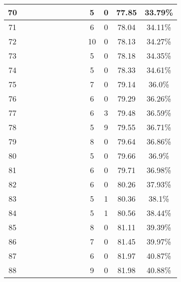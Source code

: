 \begin{longtable}{|c|c|c|c|c|c|c|c|c|c|c|c|c|}
70 &  \x    & \x    & \x    & \x    & \x    & \x\m  & \x    &       & 5 & 0 & 77.85 & 33.79\% \\ \hline
71 &  \x    & \x    & \x    & \x    &       & \x    &       &       & 6 & 0 & 78.04 & 34.11\% \\ \hline
72 &  \x    & \x    &       &       & \x\m  &       & \x\m  &       & 10 & 0 & 78.13 & 34.27\% \\ \hline
73 &  \x    & \x    & \x    &       & \x    & \x\m  &       & \x    & 5 & 0 & 78.18 & 34.35\% \\ \hline
74 &  \x    & \x    & \x    & \x    &       & \x\m  & \x\m  &       & 5 & 0 & 78.33 & 34.61\% \\ \hline
75 &  \x    & \x    & \x    & \x    &       &       &       & \x\m  & 7 & 0 & 79.14 & 36.0\% \\ \hline
76 &  \x    & \x    & \x    &       &       &       &       &       & 6 & 0 & 79.29 & 36.26\% \\ \hline
77 &  \x    & \x    & \x    &       &       & \x\m  &       & \x\m  & 6 & 3 & 79.48 & 36.59\% \\ \hline
78 &  \x    & \x    & \x    & \x    &       & \x\m  &       & \x\m  & 5 & 9 & 79.55 & 36.71\% \\ \hline
79 &  \x    & \x    & \x    &       &       &       &       & \x\m  & 8 & 0 & 79.64 & 36.86\% \\ \hline
80 &  \x    & \x    &       &       & \x    & \x    &       &       & 5 & 0 & 79.66 & 36.9\% \\ \hline
81 &  \x    & \x    & \x    &       & \x    & \x    & \x\m  &       & 6 & 0 & 79.71 & 36.98\% \\ \hline
82 &  \x    & \x    & \x    & \x    &       &       & \x    &       & 6 & 0 & 80.26 & 37.93\% \\ \hline
83 &  \x    & \x    & \x    &       &       &       & \x    &       & 5 & 1 & 80.36 & 38.1\% \\ \hline
84 &  \x    & \x    & \x    &       & \x\m  &       &       & \x    & 5 & 1 & 80.56 & 38.44\% \\ \hline
85 &  \x    & \x    & \x    & \x    &       &       &       & \x    & 8 & 0 & 81.11 & 39.39\% \\ \hline
86 &  \x    & \x    & \x    &       &       & \x    & \x    &       & 7 & 0 & 81.45 & 39.97\% \\ \hline
87 &  \x    & \x    & \x    &       &       & \x\m  &       & \x\m  & 6 & 0 & 81.97 & 40.87\% \\ \hline
88 &  \x    & \x    & \x    & \x    &       & \x\m  &       & \x\m  & 9 & 0 & 81.98 & 40.88\% \\ \hline

\end{longtable}
